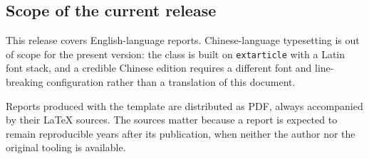 \subsection{Scope of the current release}

This release covers English-language reports. Chinese-language typesetting is out of scope for
the present version: the class is built on \texttt{extarticle} with a Latin font stack, and a
credible Chinese edition requires a different font and line-breaking configuration rather than
a translation of this document.

Reports produced with the template are distributed as PDF, always accompanied by their \LaTeX{}
sources. The sources matter because a report is expected to remain reproducible years after its
publication, when neither the author nor the original tooling is available.
